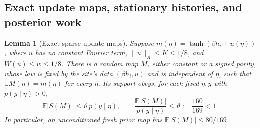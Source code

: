 \documentclass[11pt]{article}
\newtheorem{lemma}[theorem]{Lemma}
\theoremstyle{definition}\newtheorem{definition}[theorem]{Definition}
\theoremstyle{remark}\newtheorem{remark}[theorem]{Remark}
\newcommand{\E}{\mathbb E}\newcommand{\Prb}{\mathbb P}
\begin{document}
\subsection{Exact update maps, stationary histories, and posterior work}
\begin{lemma}[Exact sparse update maps]\label{lem:maps}
Suppose \(m(\eta)=\tanh(\beta h_i+u(\eta))\), where \(u\) has no constant Fourier term, \(\|u\|_A\le K\le1/8\), and \(W(u)\le w\le1/8\). There is a random map \(M\), either constant or a signed parity, whose law is fixed by the site's data \((\beta h_i,u)\) and is independent of \(\eta\), such that \(\E M(\eta)=m(\eta)\) for every \(\eta\). Its support obeys, for each fixed \(\eta,y\) with \(p(y\mid\eta)>0\),
\[
 \E|S(M)|\le\vartheta\,p(y\mid\eta),\qquad
 \frac{\E|S(M)|}{p(y\mid\eta)}\le\vartheta:=\frac{160}{169}<1.
\]
In particular, an unconditioned fresh prior map has \(\E|S(M)|\le80/169\).
\end{lemma}
\end{document}
